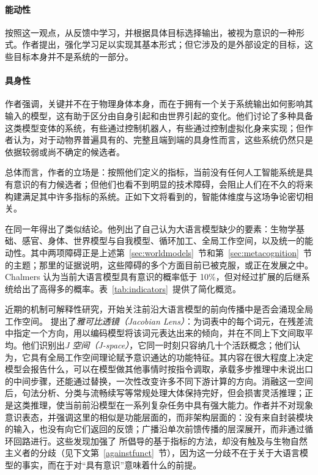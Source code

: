 \paragraph{能动性} 按照这一观点，从反馈中学习，并根据具体目标选择输出，被视为意识的一种形式。作者提出，强化学习足以实现其基本形式；但它涉及的是外部设定的目标，这些目标本身并不是系统的一部分。

\paragraph{具身性} 作者强调，关键并不在于物理身体本身，而在于拥有一个关于系统输出如何影响其输入的模型，这有助于区分由自身引起和由世界引起的变化。他们讨论了多种具备这类模型变体的系统，有些通过控制机器人，有些通过控制虚拟化身来实现；但作者认为，对于动物界普遍具有的、完整且端到端的具身性而言，这些系统仍然只是依据较弱或尚不确定的候选者。

总体而言，作者的立场是：按照他们定义的指标，当前没有任何人工智能系统是具有意识的有力候选者；但他们也看不到明显的技术障碍，会阻止人们在不久的将来构建满足其中许多指标的系统。正如下文将看到的，智能体维度与这场争论密切相关。

\citet{chalmers2023could} 在同一年得出了类似结论。他列出了自己认为大语言模型缺少的要素：生物学基础、感官、身体、世界模型与自我模型、循环加工、全局工作空间，以及统一的能动性。其中两项障碍正是上述第~\ref{sec:worldmodels}~节和第~\ref{sec:metacognition}~节的主题；那里的证据说明，这些障碍的多个方面目前已被克服，或正在发展之中。Chalmers 认为当前大语言模型具有意识的概率低于 10\%，但对经过扩展的后继系统给出了高得多的概率。表~\ref{tab:indicators}~提供了简化概览。

近期的机制可解释性研究，开始关注前沿大语言模型的前向传播中是否会涌现全局工作空间。\citet{gurnee2026verbalize} 提出了\emph{雅可比透镜（Jacobian Lens）}：为词表中的每个词元，在残差流中指定一个方向，用以编码模型将该词元表达出来的倾向，并在不同上下文间取平均。他们识别出\emph{J 空间（J-space）}，它同一时刻只容纳几十个活跃概念；他们认为，它具有全局工作空间理论赋予意识通达的功能特征。其内容在很大程度上决定模型会报告什么，可以在模型做其他事情时按指令调取，承载多步推理中未说出口的中间步骤，还能通过替换，一次性改变许多不同下游计算的方向。消融这一空间后，句法分析、分类与流畅续写等常规处理大体保持完好，但会损害灵活推理；正是这类推理，使当前前沿模型在一系列复杂任务中具有强大能力。作者并不对现象意识表态，并强调这里的相似是功能层面的，而非架构层面的：没有来自封装模块的输入，也没有向它们返回的反馈；广播沿单次前馈传播的层深展开，而非通过循环回路进行。这些发现加强了 \citet{butlin2023consciousness} 所倡导的基于指标的方法，却没有触及与生物自然主义者的分歧（见下文第~\ref{againstfunct}~节），因为这一分歧不在于关于大语言模型的事实，而在于对“具有意识”意味着什么的前提。

